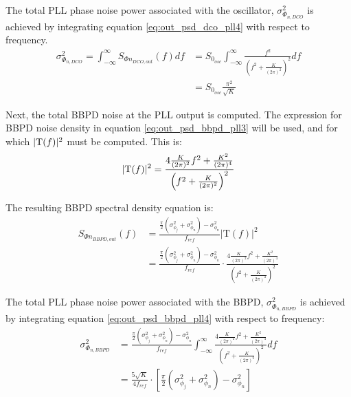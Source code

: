 			The total PLL phase noise power associated with the oscillator, $\sigma_{\Phi_{n,DCO}}^2$ is achieved by integrating equation \ref{eq:out_psd_dco_pll4} with respect to frequency.
			\begin{align}\label{eq:out_psd_dco_pll5} \sigma_{\Phi_{n,DCO}}^2 =
				\int_{-\infty}^{\infty} S_{\Phi n_{DCO,out}}(f)df &=
				S_{0_{osc}}\int_{-\infty}^{\infty}\frac{f^2}{\left(f^2+\frac{K}{(2\pi)^2}\right)^2}df
				\\ &= S_{0_{osc}}\frac{\pi^2}{\sqrt{K}} 
			\end{align} 

			Next, the total BBPD noise at the PLL output is computed. The expression for BBPD noise density in equation \ref{eq:out_psd_bbpd_pll3} will be used, and for which $|\textnormal{T}(f)|^2$ must be computed. This is: 
			\begin{equation} 
				|\textnormal{T}(f)|^2 =
				\frac{4\frac{K}{(2\pi)^2}f^2 +
				\frac{K^2}{(2\pi)^4}}{\left(f^2+\frac{K}{(2\pi)^2}\right)^2} 
			\end{equation}

			The resulting BBPD spectral density equation is:
			\begin{align}\label{eq:out_psd_bbpd_pll4} 
				S_{\Phi n_{BBPD,out}}(f) & =
				\frac{\frac{\pi}{2}(\sigma^2_{\phi_j} +
				\sigma^2_{\phi_n})-\sigma^2_{\phi_n}}{f_{ref}}\left|\mathrm{T}(f)\right|^2
				\\&= \frac{\frac{\pi}{2}(\sigma^2_{\phi_j} +
				\sigma^2_{\phi_n})-\sigma^2_{\phi_n}}{f_{ref}}\cdot\frac{4\frac{K}{(2\pi)^2}f^2
				+ \frac{K^2}{(2\pi)^4}}{\left(f^2+\frac{K}{(2\pi)^2}\right)^2} 
			\end{align} 

			The total PLL phase noise power associated with the BBPD, $\sigma_{\Phi_{n,BBPD}}^2$ is achieved by integrating equation \ref{eq:out_psd_bbpd_pll4} with respect to frequency:
			\begin{align}\label{eq:out_psd_bbpd_pll5} 
				\sigma_{\Phi_{n,BBPD}}^2 & =
				\frac{\frac{\pi}{2}(\sigma^2_{\phi_j} +
				\sigma^2_{\phi_n})-\sigma^2_{\phi_n}}{f_{ref}}\int_{-\infty}^{\infty}\frac{4\frac{K}{(2\pi)^2}f^2
				+ \frac{K^2}{(2\pi)^4}}{\left(f^2+\frac{K}{(2\pi)^2}\right)^2}df\\ &= 
				\frac{5\sqrt{K}}{4f_{ref}}\cdot\left[\frac{\pi}{2}(\sigma^2_{\phi_j} +
			\sigma^2_{\phi_n})-\sigma^2_{\phi_n}\right] \end{align} 

